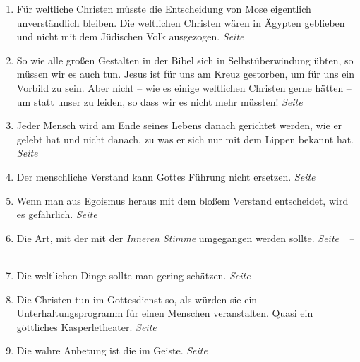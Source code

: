 \begin{enumerate}
 \item Für weltliche Christen müsste die Entscheidung von Mose eigentlich
unverständlich bleiben. Die weltlichen Christen wären in Ägypten geblieben und
nicht mit dem Jüdischen Volk ausgezogen.
 \dotfill \textit{Seite~\pageref{ref:04_17_mose}}\\

 \item So wie alle großen Gestalten in der Bibel sich in Selbstüberwindung
übten, so müssen wir es auch tun. Jesus ist für uns am Kreuz gestorben, um für uns
ein Vorbild zu sein. Aber nicht -- wie es einige weltlichen Christen gerne
hätten -- um statt unser zu leiden, so dass wir es nicht mehr müssten!
 \dotfill \textit{Seite~\pageref{ref:04_20_opfertod}}\\

 \item Jeder Mensch wird am Ende seines Lebens danach gerichtet werden, wie er
gelebt hat und nicht danach, zu was er sich nur mit dem Lippen bekannt hat.
 \dotfill \textit{Seite~\pageref{ref:04_21_gericht}}\\

 \item Der menschliche Verstand kann Gottes Führung nicht ersetzen.
 \dotfill \textit{Seite~\pageref{ref:04_22_vernunft}}\\

 \item Wenn man aus Egoismus heraus mit dem bloßem Verstand entscheidet, wird
es gefährlich.
 \dotfill \textit{Seite~\pageref{ref:04_22_vernunft_und_ego}}\\

 \item Die Art, mit der mit der \textit{Inneren Stimme} umgegangen werden
sollte.
 \dotfill
 \textit{Seite~\pageref{ref:04_23_innere_stimme}~--~\pageref{ref:04_23_innere_stimme_ende}}\\

 \item Die weltlichen Dinge sollte man gering schätzen.
 \dotfill \textit{Seite~\pageref{ref:04_23_dinge_der_welt}}\\

 \item Die Christen tun im Gottesdienst so, als würden sie ein
Unterhaltungsprogramm
 für einen Menschen veranstalten. Quasi ein göttliches Kasperletheater.
 \dotfill \textit{Seite~\pageref{ref:05_02_kasperletheater}}\\

 \item Die wahre Anbetung ist die im Geiste.
 \dotfill \textit{Seite~\pageref{ref:05_04_wahre_anbetung}}\\


\end{enumerate}
